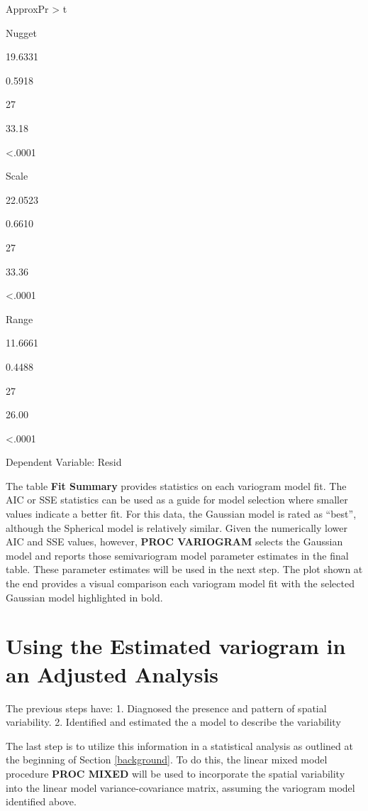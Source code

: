 \documentclass[
]{book}
\begin{document}
ApproxPr \textgreater{} \textbar t\textbar{}

Nugget

19.6331

0.5918

27

33.18

\textless.0001

Scale

22.0523

0.6610

27

33.36

\textless.0001

Range

11.6661

0.4488

27

26.00

\textless.0001

Dependent Variable: Resid

The table \textbf{Fit Summary} provides statistics on each variogram model fit. The AIC or SSE statistics can be used as a guide for model selection where smaller values indicate a better fit. For this data, the Gaussian model is rated as ``best'', although the Spherical model is relatively similar. Given the numerically lower AIC and SSE values, however, \textbf{PROC VARIOGRAM} selects the Gaussian model and reports those semivariogram model parameter estimates in the final table. These parameter estimates will be used in the next step. The plot shown at the end provides a visual comparison each variogram model fit with the selected Gaussian model highlighted in bold.

\hypertarget{using-the-estimated-variogram-in-an-adjusted-analysis}{%
\section{Using the Estimated variogram in an Adjusted Analysis}\label{using-the-estimated-variogram-in-an-adjusted-analysis}}

The previous steps have:
1. Diagnosed the presence and pattern of spatial variability.
2. Identified and estimated the a model to describe the variability

The last step is to utilize this information in a statistical analysis as outlined at the beginning of Section \ref{background}. To do this, the linear mixed model procedure \textbf{PROC MIXED} will be used to incorporate the spatial variability into the linear model variance-covariance matrix, assuming the variogram model identified above.
\end{document}
